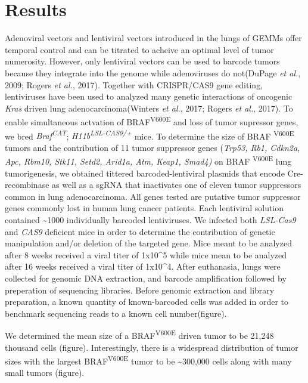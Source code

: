 \hypertarget{results}{%
\section{Results}\label{results}}

Adenoviral vectors and lentiviral vectors introduced in the lungs of GEMMs offer temporal control and can be titrated to acheive an optimal level of tumor numerosity.
However, only lentiviral vectors can be used to barcode tumors because they integrate into the genome while adenoviruses do not(DuPage \emph{et al.}, 2009; Rogers \emph{et al.}, 2017).
Together with CRISPR/CAS9 gene editing, lentiviruses have been used to analyzed many genetic interactions of oncogenic \emph{Kras} driven lung adenocarcinoma(Winters \emph{et al.}, 2017; Rogers \emph{et al.}, 2017).
To enable simultaneous actvation of BRAF\textsuperscript{V600E} and loss of tumor supressor genes, we bred \emph{Braf\textsuperscript{CAT}}; \emph{H11b\textsuperscript{LSL-CAS9/+}} mice.
To determine the size of BRAF \textsuperscript{V600E} tumors and the contribution of 11 tumor suppressor genes (\emph{Trp53, Rb1, Cdkn2a, Apc, Rbm10, Stk11, Setd2, Arid1a, Atm, Keap1, Smad4)} on BRAF \textsuperscript{V600E} lung tumorigenesis, we obtained tittered barcoded-lentiviral plasmids that encode Cre-recombinase as well as a sgRNA that inactivates one of eleven tumor suppressors common in lung adenocarcinoma.
All genes tested are putative tumor suppressor genes commonly lost in human lung cancer patients. Each lentiviral solution contained \textasciitilde1000 individually barcoded lentiviruses.
We infected both \emph{LSL-Cas9} and \emph{CAS9} deficient mice in order to determine the contribution of genetic manipulation and/or deletion of the targeted gene.
Mice meant to be analyzed after 8 weeks received a viral titer of 1x10\^{}5 while mice mean to be analyzed after 16 weeks received a viral titer of 1x10\^{}4. After euthanasia, lungs were collected for genomic DNA extraction, and barcode amplification followed by preperation of sequencing libraries.
Before genomic extraction and library preparation, a known quantity of known-barcoded cells was added in order to benchmark sequencing reads to a known cell number(figure).

We determined the mean size of a BRAF\textsuperscript{V600E} driven tumor to be 21,248 thousand cells (figure).
Interestingly, there is a widespread distribution of tumor sizes with the largest BRAF\textsuperscript{V600E} tumor to be \textasciitilde300,000 cells along with many small tumors (figure).

